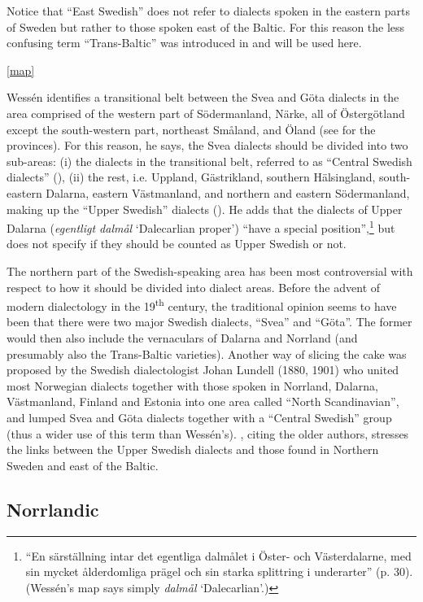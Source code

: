 Notice that “East Swedish” does not refer to dialects spoken in the eastern parts of Sweden but rather to those spoken east of the Baltic. For this reason the less confusing term “Trans-Baltic” was introduced in \citet{Rendahl2001} and will be used here.

\label{map} %
\ref{map}

Wessén identifies a transitional belt between the Svea and Göta dialects in the area comprised of the western part of Södermanland, Närke, all of Östergötland except the south-western part, northeast Småland, and Öland (see  for the provinces). For this reason, he says, the Svea dialects should be divided into two sub-areas: (i) the dialects in the transitional belt, referred to as “Central Swedish dialects” (), (ii) the rest, i.e. Uppland, Gästrikland, southern Hälsingland, south-eastern Dalarna, eastern Västmanland, and northern and eastern Södermanland, making up the “Upper Swedish” dialects (). He adds that the dialects of Upper Dalarna (\textit{egentligt dalmål} ‘Dalecarlian proper’) \label{bkm:wessenquote}“have a special position”,\footnote{“En särställning intar det egentliga dalmålet i Öster- och Västerdalarne, med sin mycket ålderdomliga prägel och sin starka splittring i underarter” (p. 30).  (Wessén’s map says simply \textit{dalmål} ‘Dalecarlian’.)} but does not specify if they should be counted as Upper Swedish or not.

The northern part of the Swedish-speaking area has been most controversial with respect to how it should be divided into dialect areas. Before the advent of modern dialectology in the 19\textsuperscript{th} century, the traditional opinion seems to have been that there were two major Swedish dialects, “Svea” and “Göta”. The former would then also include the vernaculars of Dalarna and Norrland (and presumably also the Trans-Baltic varieties). Another way of slicing the cake was proposed by the Swedish dialectologist Johan Lundell (1880, 1901) who united most Norwegian dialects together with those spoken in Norrland, Dalarna, Västmanland, Finland and Estonia into one area called “North Scandinavian”, and lumped Svea and Göta dialects together with a “Central Swedish” group (thus a wider use of this term than Wessén’s). \citet{Hesselman1905}, citing the older authors, stresses the links between the Upper Swedish dialects and those found in Northern Sweden and east of the Baltic. 

\subsection{ Norrlandic}

